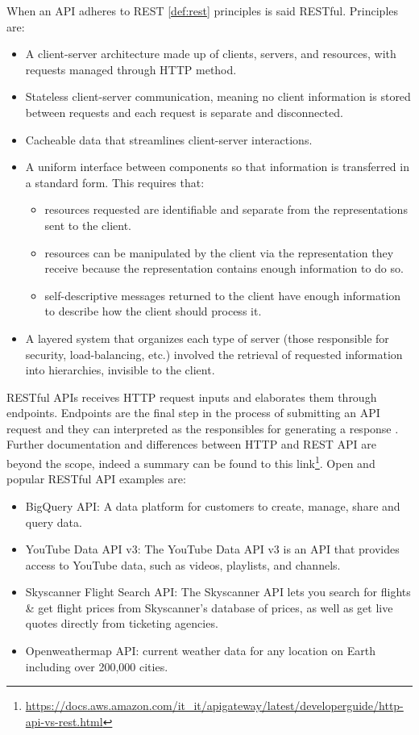\documentclass[
  12pt,
  a4paper,
  oneside]{book}
\DeclareRobustCommand{\href}[2]{#2\footnote{\url{#1}}}
\providecommand{\tightlist}{%
  \setlength{\itemsep}{0pt}\setlength{\parskip}{0pt}}
\theoremstyle{definition}
\theoremstyle{definition}
\theoremstyle{definition}
\theoremstyle{remark}
\begin{document}
When an API adheres to REST \ref{def:rest} principles is said RESTful. Principles are:

\begin{itemize}
\tightlist
\item
  A client-server architecture made up of clients, servers, and resources, with requests managed through HTTP method.
\item
  Stateless client-server communication, meaning no client information is stored between requests and each request is separate and disconnected.
\item
  Cacheable data that streamlines client-server interactions.
\item
  A uniform interface between components so that information is transferred in a standard form. This requires that:

  \begin{itemize}
  \tightlist
  \item
    resources requested are identifiable and separate from the representations sent to the client.
  \item
    resources can be manipulated by the client via the representation they receive because the representation contains enough information to do so.
  \item
    self-descriptive messages returned to the client have enough information to describe how the client should process it.
  \end{itemize}
\item
  A layered system that organizes each type of server (those responsible for security, load-balancing, etc.) involved the retrieval of requested information into hierarchies, invisible to the client.
\end{itemize}

RESTful APIs receives HTTP request inputs and elaborates them through endpoints. Endpoints are the final step in the process of submitting an API request and they can interpreted as the responsibles for generating a response \citeyearpar{plumber}. Further documentation and differences between HTTP and REST API are beyond the scope, indeed a summary can be found to this \href{https://docs.aws.amazon.com/it_it/apigateway/latest/developerguide/http-api-vs-rest.html}{link}.
Open and popular RESTful API examples are:

\begin{itemize}
\tightlist
\item
  BigQuery API: A data platform for customers to create, manage, share and query data.
\item
  YouTube Data API v3: The YouTube Data API v3 is an API that provides access to YouTube data, such as videos, playlists, and channels.
\item
  Skyscanner Flight Search API: The Skyscanner API lets you search for flights \& get flight prices from Skyscanner's database of prices, as well as get live quotes directly from ticketing agencies.
\item
  Openweathermap API: current weather data for any location on Earth including over 200,000 cities.
\end{itemize}
\end{document}
